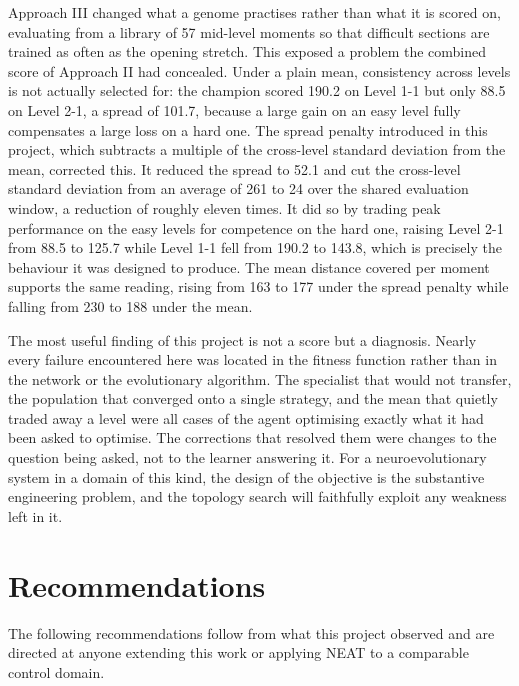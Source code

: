 \noindent
Approach III changed what a genome practises rather than what it is scored on,
evaluating from a library of 57 mid-level moments so that difficult sections
are trained as often as the opening stretch. This exposed a problem the
combined score of Approach II had concealed. Under a plain mean, consistency
across levels is not actually selected for: the champion scored 190.2 on Level
1-1 but only 88.5 on Level 2-1, a spread of 101.7, because a large gain on an
easy level fully compensates a large loss on a hard one. The spread penalty
introduced in this project, which subtracts a multiple of the cross-level
standard deviation from the mean, corrected this. It reduced the spread to 52.1
and cut the cross-level standard deviation from an average of 261 to 24 over
the shared evaluation window, a reduction of roughly eleven times. It did so by
trading peak performance on the easy levels for competence on the hard one,
raising Level 2-1 from 88.5 to 125.7 while Level 1-1 fell from 190.2 to 143.8,
which is precisely the behaviour it was designed to produce. The mean distance
covered per moment supports the same reading, rising from 163 to 177 under the
spread penalty while falling from 230 to 188 under the mean.

\noindent
The most useful finding of this project is not a score but a diagnosis. Nearly
every failure encountered here was located in the fitness function rather than
in the network or the evolutionary algorithm. The specialist that would not
transfer, the population that converged onto a single strategy, and the mean
that quietly traded away a level were all cases of the agent optimising exactly
what it had been asked to optimise. The corrections that resolved them were
changes to the question being asked, not to the learner answering it. For a
neuroevolutionary system in a domain of this kind, the design of the objective
is the substantive engineering problem, and the topology search will faithfully
exploit any weakness left in it.

\section{Recommendations}
\label{sec:recommendations}

The following recommendations follow from what this project observed and are
directed at anyone extending this work or applying NEAT to a comparable
control domain.

